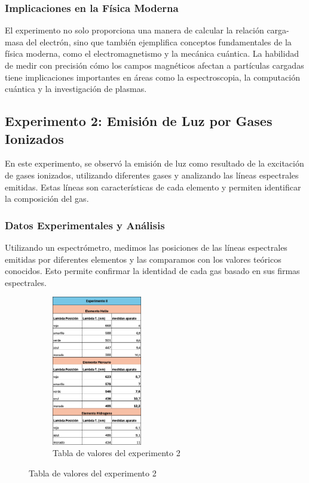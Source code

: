 \subsubsection{Implicaciones en la Física Moderna}
El experimento no solo proporciona una manera de calcular la relación carga-masa del electrón, sino que también ejemplifica conceptos fundamentales de la física moderna, como el electromagnetismo y la mecánica cuántica. La habilidad de medir con precisión cómo los campos magnéticos afectan a partículas cargadas tiene implicaciones importantes en áreas como la espectroscopia, la computación cuántica y la investigación de plasmas.

\subsection{Experimento 2: Emisión de Luz por Gases Ionizados}

En este experimento, se observó la emisión de luz como resultado de la excitación de gases ionizados, utilizando diferentes gases y analizando las líneas espectrales emitidas. Estas líneas son características de cada elemento y permiten identificar la composición del gas.

\subsubsection{Datos Experimentales y Análisis}
Utilizando un espectrómetro, medimos las posiciones de las líneas espectrales emitidas por diferentes elementos y las comparamos con los valores teóricos conocidos. Esto permite confirmar la identidad de cada gas basado en sus firmas espectrales.

\begin{figure}[H]
  \centering
  \begin{subfigure}[b]{\textwidth}
      \centering
      \includegraphics[width=0.43\textwidth]{Figures/1. Content/tabla-experimento-2.png}
      \caption{Tabla de valores del experimento 2}
      \label{fig: Tabla experimento 2}
  \end{subfigure}
  \hfill
\end{figure}

